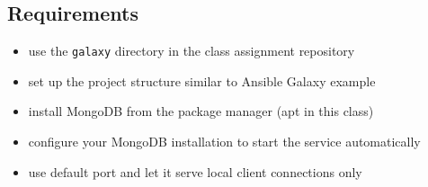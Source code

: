\subsection{Requirements}\label{requirements}

\begin{itemize}
\tightlist
\item
  use the \texttt{galaxy} directory in the class assignment repository
\item
  set up the project structure similar to Ansible Galaxy example
\item
  install MongoDB from the package manager (apt in this class)
\item
  configure your MongoDB installation to start the service automatically
\item
  use default port and let it serve local client connections only
\end{itemize}
